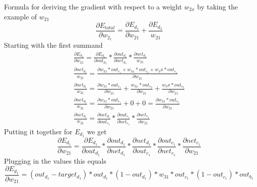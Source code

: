 \documentclass[11pt, halfparskip]{article}
\begin{document}
\newpage %
\noindent Formula for deriving the gradient with respect to a weight $w_{2x}$ by taking the example of $w_{21}$
    \begin{equation}
    	\frac{\partial E_{total}}{\partial w_{2_1}} = \frac{\partial E_{d_1}}{\partial w_{21}} + \frac{\partial E_{d_2}}{w_{21}}
    \end{equation}
Starting with the first summand
    \begin{gather}
    	\frac{\partial E_{d_1}}{\partial w_{21}} = \frac{\partial E_{d_1}}{\partial out_{d_1}} * \frac{\partial out_{d_1}}{\partial net_{d_1}} * \frac{\partial net_{d_1}}{w_{21}}\\[1em]
    	\frac{\partial net_{d_1}}{w_{21}} = \frac{\partial w_{31}*out_{c_1} + w_{3x}*out_{c_2} + w_3x*out_{c_1}}{\partial w_{21}}\\
    	\frac{\partial net_{d_1}}{w_{21}} = \frac{\partial w_{31}*out_{c_1}}{\partial w_{21}} + \frac{w_{3x}*out_{c_2}}{\partial w_{21}} + \frac{w_3x*out_{c_3}}{\partial w_{21}}\\
    	\frac{\partial net_{d_1}}{w_{21}} = \frac{\partial w_{31}*out_{c_1}}{\partial w_{21}} + 0 + 0 = \frac{\partial w_{31}*out_{c_1}}{\partial w_{21}}\\[1em]
    	\frac{\partial net_{d_1}}{w_{21}} = \frac{\partial net_{d_1}}{\partial out_{c_1}} * \frac{\partial out_{c_1}}{\partial net_{c_1}} * \frac{\partial net_{c_1}}{\partial w_{21}}
    \end{gather}
Putting it together for $E_{d_1}$ we get
    \begin{equation}
    	\frac{\partial E_{d_1}}{\partial w_{21}} = \frac{\partial E_{d_1}}{\partial out_{d_1}} * \frac{\partial out_{d_1}}{\partial net_{d_1}} * \frac{\partial net_{d_1}}{\partial 				out_{c_1}} * \frac{\partial out_{c_1}}{\partial net_{c_1}} * \frac{\partial net_{c_1}}{\partial w_{21}}
    \end{equation}
Plugging in the values this equals
    \begin{equation}
    	\frac{\partial E_{d_1}}{\partial w_{21}} = (out_{d_1} - target_{d_1}) * out_{d_1} * (1 - out_{d_1}) * w_{31} * out_{c_1} * (1 - out_{c_1}) * out_{b_1}
    \end{equation}
    
\end{document}
